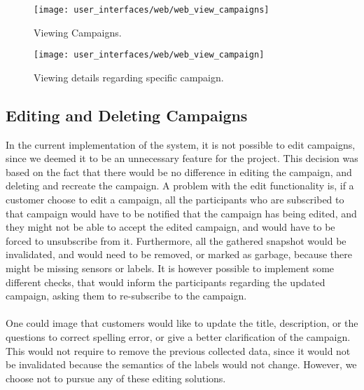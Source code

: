 \begin{figure}[!htbp]
\centering
\texttt{[image: user\_interfaces/web/web\_view\_campaigns]}
\caption{Viewing Campaigns.}
\label{fig:web_view_campaigns}
\end{figure}
\FloatBarrier

\begin{figure}[!htbp]
\centering
\texttt{[image: user\_interfaces/web/web\_view\_campaign]}
\caption{Viewing details regarding specific campaign.}
\label{fig:web_view_campaign}
\end{figure}
\FloatBarrier

\subsection{Editing and Deleting Campaigns}
\label{sub:editing_and_deleting_campaigns}

In the current implementation of the system, it is not possible to edit campaigns, since we deemed it to be an unnecessary feature for the project. This decision was based on the fact that there would be no difference in editing the campaign, and deleting and recreate the campaign. A problem with the edit functionality is, if a customer choose to edit a campaign, all the participants who are subscribed to that campaign would have to be notified that the campaign has being edited, and they might not be able to accept the edited campaign, and would have to be forced to unsubscribe from it. Furthermore, all the gathered snapshot would be invalidated, and would need to be removed, or marked as garbage, because there might be missing sensors or labels. It is however possible to implement some different checks, that would inform the participants regarding the updated campaign, asking them to re-subscribe to the campaign. 
\\\\
One could image that customers would like to update the title, description, or the questions to correct spelling error, or give a better clarification of the campaign. This would not require to remove the previous collected data, since it would not be invalidated because the semantics of the labels would not change. However, we choose not to pursue any of these editing solutions.

